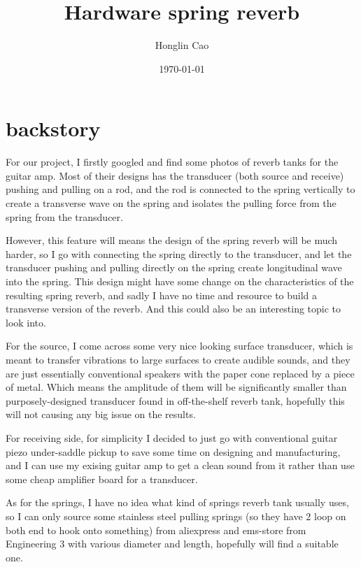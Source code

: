 \documentclass[11pt,a4paper]{article}
\begin{document}
\title{Hardware spring reverb}
\author{Honglin Cao}
\date{\today}
\maketitle

\section{backstory}

For our project, I firstly googled and find some photos of reverb tanks for the guitar amp. Most of their designs has the transducer (both source and receive) pushing and pulling on a rod, and the rod is connected to the spring vertically to create a transverse wave on the spring and isolates the pulling force from the spring from the transducer.

However, this feature will means the design of the spring reverb will be much harder, so I go with connecting the spring directly to the transducer, and let the transducer pushing and pulling directly on the spring create longitudinal wave into the spring. This design might have some change on the characteristics of the resulting spring reverb, and sadly I have no time and resource to build a transverse version of the reverb. And this could also be an interesting topic to look into.

For the source, I come across some very nice looking surface transducer, which is meant to transfer vibrations to large surfaces to create audible sounds, and they are just essentially conventional speakers with the paper cone replaced by a piece of metal. Which means the amplitude of them will be significantly smaller than purposely-designed transducer found in off-the-shelf reverb tank, hopefully this will not causing any big issue on the results.

For receiving side, for simplicity I decided to just go with conventional guitar piezo under-saddle pickup to save some time on designing and manufacturing, and I can use my exising guitar amp to get a clean sound from it rather than use some cheap amplifier board for a transducer.

As for the springs, I have no idea what kind of springs reverb tank usually uses, so I can only source some stainless steel pulling springs (so they have 2 loop on both end to hook onto something) from aliexpress and ems-store from Engineering 3 with various diameter and length, hopefully will find a suitable one.

\newpage
\end{document}
